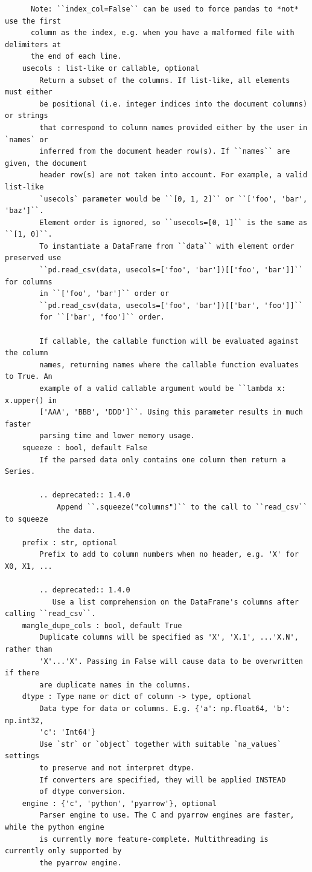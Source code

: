 \documentclass[
  letterpaper,
]{book}
\begin{document}
\begin{verbatim}
      Note: ``index_col=False`` can be used to force pandas to *not* use the first
      column as the index, e.g. when you have a malformed file with delimiters at
      the end of each line.
    usecols : list-like or callable, optional
        Return a subset of the columns. If list-like, all elements must either
        be positional (i.e. integer indices into the document columns) or strings
        that correspond to column names provided either by the user in `names` or
        inferred from the document header row(s). If ``names`` are given, the document
        header row(s) are not taken into account. For example, a valid list-like
        `usecols` parameter would be ``[0, 1, 2]`` or ``['foo', 'bar', 'baz']``.
        Element order is ignored, so ``usecols=[0, 1]`` is the same as ``[1, 0]``.
        To instantiate a DataFrame from ``data`` with element order preserved use
        ``pd.read_csv(data, usecols=['foo', 'bar'])[['foo', 'bar']]`` for columns
        in ``['foo', 'bar']`` order or
        ``pd.read_csv(data, usecols=['foo', 'bar'])[['bar', 'foo']]``
        for ``['bar', 'foo']`` order.

        If callable, the callable function will be evaluated against the column
        names, returning names where the callable function evaluates to True. An
        example of a valid callable argument would be ``lambda x: x.upper() in
        ['AAA', 'BBB', 'DDD']``. Using this parameter results in much faster
        parsing time and lower memory usage.
    squeeze : bool, default False
        If the parsed data only contains one column then return a Series.

        .. deprecated:: 1.4.0
            Append ``.squeeze("columns")`` to the call to ``read_csv`` to squeeze
            the data.
    prefix : str, optional
        Prefix to add to column numbers when no header, e.g. 'X' for X0, X1, ...

        .. deprecated:: 1.4.0
           Use a list comprehension on the DataFrame's columns after calling ``read_csv``.
    mangle_dupe_cols : bool, default True
        Duplicate columns will be specified as 'X', 'X.1', ...'X.N', rather than
        'X'...'X'. Passing in False will cause data to be overwritten if there
        are duplicate names in the columns.
    dtype : Type name or dict of column -> type, optional
        Data type for data or columns. E.g. {'a': np.float64, 'b': np.int32,
        'c': 'Int64'}
        Use `str` or `object` together with suitable `na_values` settings
        to preserve and not interpret dtype.
        If converters are specified, they will be applied INSTEAD
        of dtype conversion.
    engine : {'c', 'python', 'pyarrow'}, optional
        Parser engine to use. The C and pyarrow engines are faster, while the python engine
        is currently more feature-complete. Multithreading is currently only supported by
        the pyarrow engine.


\end{verbatim}
\end{document}
